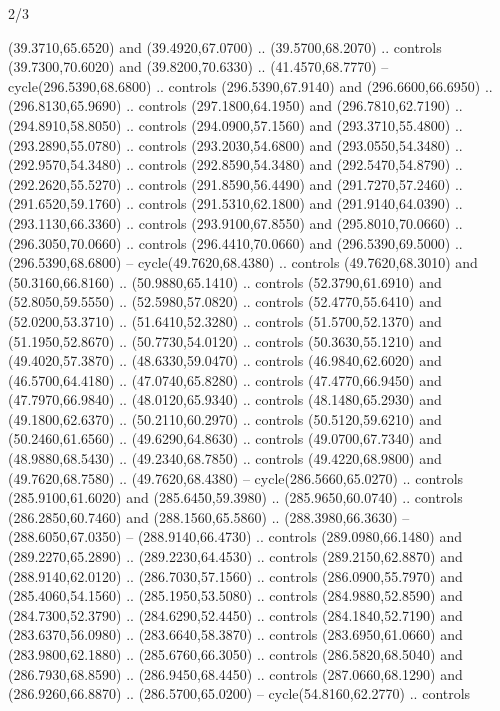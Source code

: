 \begin{flagdescription}{2/3}
\begin{scope}[xshift=0.5\flaglength,yshift=0.5\flagwidth,scale=\stretchfactor]
\begin{scope}[scale=0.001645\flagwidth,yshift=65mm,xshift=-63mm]
\begin{scope}[y=0.80pt, x=0.80pt, yscale=-1,]
\begin{scope}[cm={{1.33333,0.0,0.0,1.33333,(0.0,1e-05)}}]
  (39.3710,65.6520) and (39.4920,67.0700) .. (39.5700,68.2070) .. controls
  (39.7300,70.6020) and (39.8200,70.6330) .. (41.4570,68.7770) --
  cycle(296.5390,68.6800) .. controls (296.5390,67.9140) and (296.6600,66.6950)
  .. (296.8130,65.9690) .. controls (297.1800,64.1950) and (296.7810,62.7190) ..
  (294.8910,58.8050) .. controls (294.0900,57.1560) and (293.3710,55.4800) ..
  (293.2890,55.0780) .. controls (293.2030,54.6800) and (293.0550,54.3480) ..
  (292.9570,54.3480) .. controls (292.8590,54.3480) and (292.5470,54.8790) ..
  (292.2620,55.5270) .. controls (291.8590,56.4490) and (291.7270,57.2460) ..
  (291.6520,59.1760) .. controls (291.5310,62.1800) and (291.9140,64.0390) ..
  (293.1130,66.3360) .. controls (293.9100,67.8550) and (295.8010,70.0660) ..
  (296.3050,70.0660) .. controls (296.4410,70.0660) and (296.5390,69.5000) ..
  (296.5390,68.6800) -- cycle(49.7620,68.4380) .. controls (49.7620,68.3010) and
  (50.3160,66.8160) .. (50.9880,65.1410) .. controls (52.3790,61.6910) and
  (52.8050,59.5550) .. (52.5980,57.0820) .. controls (52.4770,55.6410) and
  (52.0200,53.3710) .. (51.6410,52.3280) .. controls (51.5700,52.1370) and
  (51.1950,52.8670) .. (50.7730,54.0120) .. controls (50.3630,55.1210) and
  (49.4020,57.3870) .. (48.6330,59.0470) .. controls (46.9840,62.6020) and
  (46.5700,64.4180) .. (47.0740,65.8280) .. controls (47.4770,66.9450) and
  (47.7970,66.9840) .. (48.0120,65.9340) .. controls (48.1480,65.2930) and
  (49.1800,62.6370) .. (50.2110,60.2970) .. controls (50.5120,59.6210) and
  (50.2460,61.6560) .. (49.6290,64.8630) .. controls (49.0700,67.7340) and
  (48.9880,68.5430) .. (49.2340,68.7850) .. controls (49.4220,68.9800) and
  (49.7620,68.7580) .. (49.7620,68.4380) -- cycle(286.5660,65.0270) .. controls
  (285.9100,61.6020) and (285.6450,59.3980) .. (285.9650,60.0740) .. controls
  (286.2850,60.7460) and (288.1560,65.5860) .. (288.3980,66.3630) --
  (288.6050,67.0350) -- (288.9140,66.4730) .. controls (289.0980,66.1480) and
  (289.2270,65.2890) .. (289.2230,64.4530) .. controls (289.2150,62.8870) and
  (288.9140,62.0120) .. (286.7030,57.1560) .. controls (286.0900,55.7970) and
  (285.4060,54.1560) .. (285.1950,53.5080) .. controls (284.9880,52.8590) and
  (284.7300,52.3790) .. (284.6290,52.4450) .. controls (284.1840,52.7190) and
  (283.6370,56.0980) .. (283.6640,58.3870) .. controls (283.6950,61.0660) and
  (283.9800,62.1880) .. (285.6760,66.3050) .. controls (286.5820,68.5040) and
  (286.7930,68.8590) .. (286.9450,68.4450) .. controls (287.0660,68.1290) and
  (286.9260,66.8870) .. (286.5700,65.0200) -- cycle(54.8160,62.2770) .. controls

\end{scope}
\end{scope}
\end{scope}
\end{scope}
\end{flagdescription}
